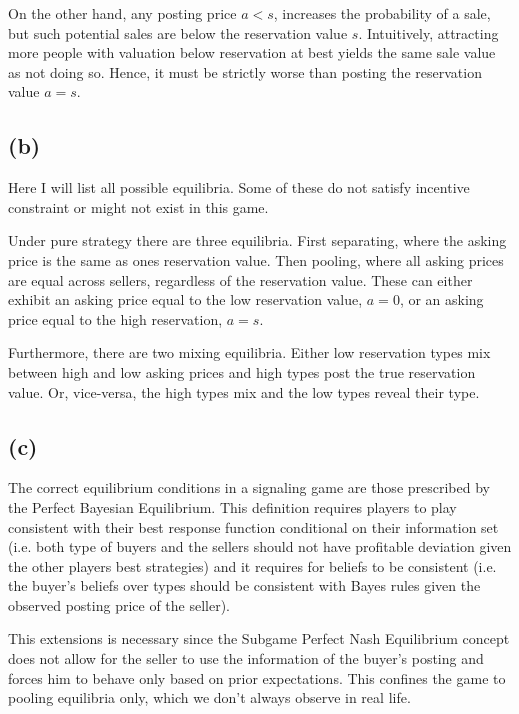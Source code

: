 \documentclass[american]{scrartcl}
\begin{document}
On the other hand, any posting price $a < s$, increases the probability of a sale, but such potential sales are below the reservation value $s$. Intuitively, attracting more people with valuation below reservation at best yields the same sale value as not doing so. Hence, it must be strictly worse than posting the reservation value $a = s$.

\subsection*{(b)}

Here I will list all possible equilibria. Some of these do not satisfy incentive constraint or might not exist in this game.

Under pure strategy there are three equilibria. First separating, where the asking price is the same as ones reservation value. Then pooling, where all asking prices are equal across sellers, regardless of the reservation value. These can either exhibit an asking price equal to the low reservation value, $a = 0$, or an asking price equal to the high reservation, $a = s$.

Furthermore, there are two mixing equilibria. Either low reservation types mix between high and low asking prices and high types post the true reservation value. Or, vice-versa, the high types mix and the low types reveal their type.

\subsection*{(c)}

The correct equilibrium conditions in a signaling game are those prescribed by the Perfect Bayesian Equilibrium. This definition requires players to play consistent with their best response function conditional on their information set (i.e. both type of buyers and the sellers should not have profitable deviation given the other players best strategies) and it requires for beliefs to be consistent (i.e. the buyer's beliefs over types should be consistent with Bayes rules given the observed posting price of the seller).

This extensions is necessary since the Subgame Perfect Nash Equilibrium concept does not allow for the seller to use the information of the buyer's posting and forces him to behave only based on prior expectations. This confines the game to pooling equilibria only, which we don't always observe in real life.
\end{document}

